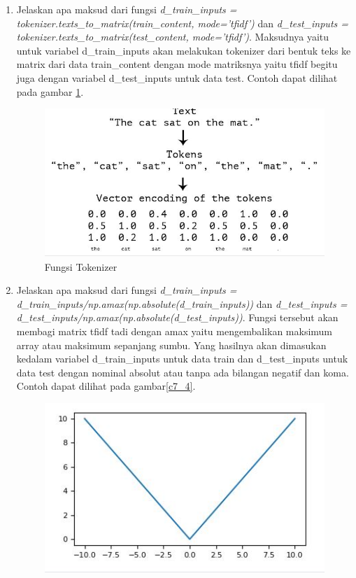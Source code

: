 \begin{enumerate}
\item Jelaskan apa maksud dari fungsi \emph{d\_train\_inputs = tokenizer.texts\_to\_matrix(train\_content, mode='tfidf')} dan \emph{d\_test\_inputs = tokenizer.texts\_to\_matrix(test\_content, mode='tfidf')}.
\subitem Maksudnya yaitu untuk variabel d\_train\_inputs akan melakukan tokenizer dari bentuk teks ke matrix dari data train\_content dengan mode matriksnya yaitu tfidf begitu juga dengan variabel d\_test\_inputs untuk data test. Contoh dapat dilihat pada gambar \ref{c7_3}.
\begin{figure}[!htbp]
	\centerline{\includegraphics[width=1\textwidth]{figures/huda/chapter7/3.JPG}}
	\caption{Fungsi Tokenizer}
	\label{c7_3}
\end{figure}
\item Jelaskan apa maksud dari fungsi \emph{d\_train\_inputs = d\_train\_inputs/np.amax(np.absolute(d\_train\_inputs))} dan \emph{d\_test\_inputs = d\_test\_inputs/np.amax(np.absolute(d\_test\_inputs))}.
\subitem Fungsi tersebut akan membagi matrix tfidf tadi dengan amax yaitu mengembalikan maksimum array atau maksimum sepanjang sumbu. Yang hasilnya akan dimasukan kedalam variabel d\_train\_inputs untuk data train dan d\_test\_inputs untuk data test dengan nominal absolut atau tanpa ada bilangan negatif dan koma. Contoh dapat dilihat pada gambar\ref{c7_4}.
\begin{figure}[!htbp]
	\centerline{\includegraphics[width=1\textwidth]{figures/huda/chapter7/4.JPG}}

\end{figure}
\end{enumerate}
